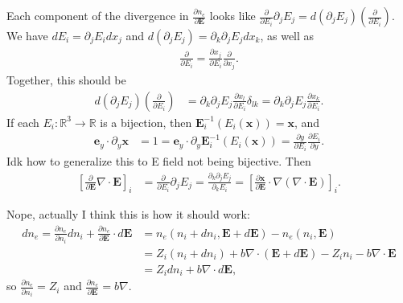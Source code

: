 \documentclass{article}
\newcommand{\p}{\partial}
\newcommand{\deriv}[2]{\frac{\p #1}{\p #2}}
\newcommand{\pth} [1] {\left( #1 \right) }
\begin{document}
Each component of the divergence in $\deriv{n_e}{\bm{E}}$ looks like $\deriv{}{E_i} \p_jE_j = d(\p_jE_j) \pth{\deriv{}{E_i}}$. We have $dE_i = \p_jE_idx_j$ and $d(\p_jE_j) = \p_k\p_jE_jdx_k$, as well as 
\begin{align*}
    \deriv{}{E_i} = \deriv{x_j}{E_i} \deriv{}{x_j}.
\end{align*}
Together, this should be 
\begin{align*}
    d(\p_jE_j)\pth{\deriv{}{E_i}} &= \p_k\p_jE_j \deriv{x_l}{E_i} \delta_{lk} = \p_k\p_jE_j \deriv{x_k}{E_i}. 
\end{align*}
If each $E_i:\mathbb{R}^3\to\mathbb{R}$ is a bijection, then $\bm{E}^{-1}_i \pth{E_i(\bm{x})} = \bm{x}$, and  
\begin{align*}
    \bm{e}_y \cdot \p_y\bm{x} &= 1 = \bm{e}_y\cdot\p_y \bm{E}_i^{-1}\pth{E_i(\bm{x})} = \deriv{y}{E_i}\deriv{E_i}{y}.
\end{align*}
Idk how to generalize this to E field not being bijective. Then 
\begin{align*}
    \left[ \deriv{}{\bm{E}} \nabla\cdot\bm{E} \right]_i &= \deriv{}{E_i} \p_jE_j = \frac{\p_k\p_jE_j}{\p_kE_i} = \left[ \deriv{\bm{x}}{\bm{E}} \cdot \nabla\pth{\nabla\cdot\bm{E}} \right]_i. 
\end{align*}
\hrulefill


Nope, actually I think this is how it should work:
\begin{align*}
    dn_e = \deriv{n_e}{n_i}dn_i + \deriv{n_e}{\bm{E}}\cdot d\bm{E} &= n_e(n_i+dn_i, \bm{E}+d\bm{E}) - n_e(n_i,\bm{E}) \\ 
    &= Z_i\pth{n_i+dn_i} + b\nabla\cdot\pth{\bm{E}+d\bm{E}} - Z_in_i - b\nabla\cdot\bm{E} \\ 
    &= Z_idn_i + b\nabla\cdot d\bm{E},
\end{align*}
so $\deriv{n_e}{n_i} = Z_i$ and $\deriv{n_e}{\bm{E}}= b\nabla$.
\end{document}
